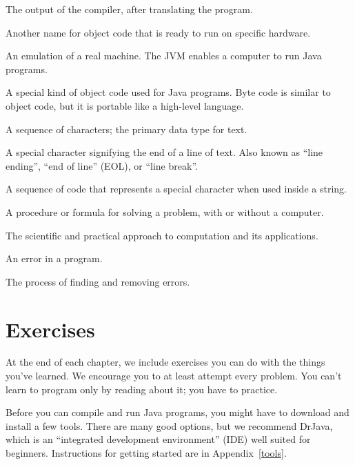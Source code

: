 \begin{description}
The output of the compiler, after translating the program.

Another name for object code that is ready to run on specific hardware.

An emulation of a real machine. The JVM enables a computer to run Java programs.

A special kind of object code used for Java programs.
Byte code is similar to object code, but it is portable like a high-level language.

A sequence of characters; the primary data type for text.

A special character signifying the end of a line of text.
Also known as ``line ending'', ``end of line'' (EOL), or ``line break''.


A sequence of code that represents a special character when used inside a string.

A procedure or formula for solving a problem, with or without a computer.

The scientific and practical approach to computation and its applications.

An error in a program.

The process of finding and removing errors.

\end{description}


\section{Exercises}
\label{computer-programming_exercises}

At the end of each chapter, we include exercises you can do with the things you've learned.
We encourage you to at least attempt every problem.
You can't learn to program only by reading about it; you have to practice.

Before you can compile and run Java programs, you might have to download and install a few tools.
There are many good options, but we recommend DrJava, which is an ``integrated development environment'' (IDE) well suited for beginners.
Instructions for getting started are in Appendix~\ref{tools}.

